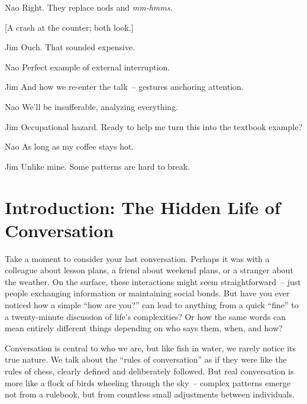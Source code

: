 \begin{sloppypar}
\begin{dialogue}
\item[Nao] Right. They replace nods and \textit{mm-hmms}. 

[A crash at the counter; both look.]

\item[Jim] Ouch. That sounded expensive.

\item[Nao] Perfect example of external interruption.

\item[Jim] And how we re-enter the talk~-- gestures anchoring attention.

\item[Nao] We'll be insufferable, analyzing everything.

\item[Jim] Occupational hazard. Ready to help me turn this into the textbook example?

\item[Nao] As long as my coffee stays hot.

\item[Jim] Unlike mine. Some patterns are hard to break.
\end{dialogue}

\end{sloppypar}

\section{Introduction: The Hidden Life of Conversation} \label{sec:intro}

Take a moment to consider your last conversation. Perhaps it was with a colleague about lesson plans, a friend about weekend plans, or a stranger about the weather. On the surface, these interactions might seem straightforward~-- just people exchanging information or maintaining social bonds. But have you ever noticed how a simple ``how are you?'' can lead to anything from a quick ``fine'' to a twenty-minute discussion of life's complexities? Or how the same words can mean entirely different things depending on who says them, when, and how?

Conversation is central to who we are, but like fish in water, we rarely notice its true nature. We talk about the ``rules of conversation'' as if they were like the rules of chess, clearly defined and deliberately followed. But real conversation is more like a flock of birds wheeling through the sky~-- complex patterns emerge not from a rulebook, but from countless small adjustments between individuals.

